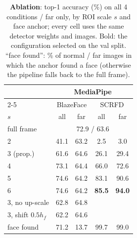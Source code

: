 \begin{table}[t]
\centering
\footnotesize
\setlength{\tabcolsep}{2.6pt}
\begin{tabular}{lcccc}
\toprule
 & \multicolumn{4}{c}{MediaPipe} \\
\cmidrule(lr){2-5}
 & \multicolumn{2}{c}{BlazeFace} & \multicolumn{2}{c}{SCRFD} \\
$s$ & all & far & all & far \\
\midrule
full frame & \multicolumn{4}{c}{72.9 / 63.6} \\
\midrule
2 & 41.1 & 63.2 & 2.5 & 3.0 \\
3 (prop.) & 61.6 & 64.6 & 26.1 & 29.4 \\
4 & 73.1 & 64.4 & 66.0 & 72.6 \\
5 & 74.6 & 64.2 & 83.1 & 90.6 \\
6 & 74.6 & 64.2 & \textbf{85.5} & \textbf{94.0} \\
\midrule
3, no up-scale & 62.8 & 64.8 &  &  \\
3, shift $0.5h_f$ & 62.2 & 64.6 &  &  \\
\midrule
face found & 71.2 & 13.7 & 99.7 & 99.0 \\
\bottomrule
\end{tabular}
\vspace{-1mm}
\caption{\textbf{Ablation}: top-1 accuracy (\%) on all 4 conditions / far only, by ROI scale $s$ and face anchor; every cell uses the same detector weights and images. Bold: the configuration selected on the val split. ``face found'': \% of normal / far images in which the anchor found a face (otherwise the pipeline falls back to the full frame).}
\label{tab:abl}
\vspace{-3mm}
\end{table}